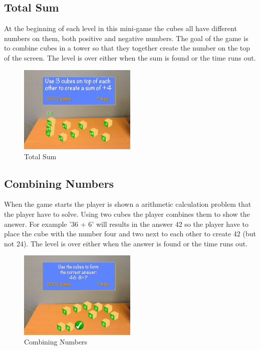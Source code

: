 \subsection{Total Sum}
\label{game:total_sum}
At the beginning of each level in this mini-game the cubes all have different numbers on them, both positive and negative numbers. The goal of the game is to combine cubes in a tower so that they together create the number on the top of the screen.
The level is over either when the sum is found or the time runs out.
\begin{figure}
	\includegraphics[width=0.5\textwidth]{images/Costas/game_mockup2(arithmetic).jpg}
	\caption{Total Sum}
	\label{fig:Costas}
	
\end{figure}

\subsection{Combining Numbers}
\label{game:combining_numbers}
When the game starts the player is shown a arithmetic calculation problem that the player have to solve. Using two cubes the player combines them to show the answer. For example '36 + 6' will results in the answer 42 so the player have to place the cube with the number four and two next to each other to create 42 (but not 24).
The level is over either when the answer is found or the time runs out.

\begin{figure}
	\includegraphics[width=0.5\textwidth]{images/Costas/game_mockup2(arithmetic2).jpg}
	\caption{Combining Numbers}
	\label{fig:Costas}
	
\end{figure}

